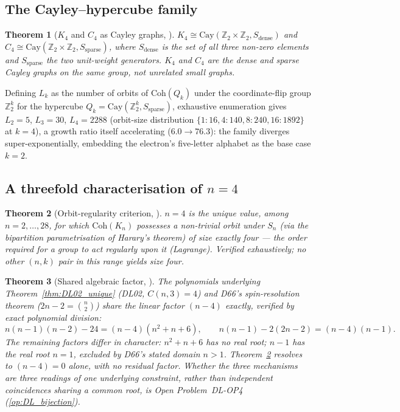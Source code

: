 \documentclass[11pt,a4paper]{article}
\theoremstyle{plain}
\newtheorem{theorem}{Theorem}[section]
\theoremstyle{definition}
\theoremstyle{remark}
\begin{document}
\subsection{The Cayley--hypercube family}

\begin{theorem}[\texorpdfstring{$K_4$}{K4} and \texorpdfstring{$C_4$}{C4} as Cayley graphs, \cite{DL03}]
\label{thm:DL03_cayley}
$K_4\cong\mathrm{Cay}(\mathbb{Z}_2\times\mathbb{Z}_2,S_{\mathrm{dense}})$ and $C_4\cong\mathrm{Cay}(\mathbb{Z}_2\times\mathbb{Z}_2,S_{\mathrm{sparse}})$, where $S_{\mathrm{dense}}$ is the set of all three non-zero elements and $S_{\mathrm{sparse}}$ the two unit-weight generators. $K_4$ and $C_4$ are the dense and sparse Cayley graphs on the same group, not unrelated small graphs.
\end{theorem}

Defining $L_k$ as the number of orbits of $\mathrm{Coh}(Q_k)$ under the coordinate-flip group $\mathbb{Z}_2^k$ for the hypercube $Q_k=\mathrm{Cay}(\mathbb{Z}_2^k,S_{\mathrm{sparse}})$, exhaustive enumeration gives $L_2=5$, $L_3=30$, $L_4=2288$ (orbit-size distribution $\{1{:}16,4{:}140,8{:}240,16{:}1892\}$ at $k=4$), a growth ratio itself accelerating ($6.0\to76.3$): the family diverges super-exponentially, embedding the electron's five-letter alphabet as the base case $k=2$.

\subsection{A threefold characterisation of \texorpdfstring{$n=4$}{n=4}}

\begin{theorem}[Orbit-regularity criterion, \cite{DL03}]
\label{thm:DL03_orbit}
$n=4$ is the unique value, among $n=2,\ldots,28$, for which $\mathrm{Coh}(K_n)$ possesses a non-trivial orbit under $S_n$ (via the bipartition parametrisation of Harary's theorem) of size exactly four --- the order required for a group to act regularly upon it (Lagrange). Verified exhaustively; no other $(n,k)$ pair in this range yields size four.
\end{theorem}

\begin{theorem}[Shared algebraic factor, \cite{DL03}]
\label{thm:DL03_factorisation}
The polynomials underlying Theorem~\ref{thm:DL02_unique} (DL02, $C(n,3)=4$) and D66's spin-resolution theorem ($2n-2=\binom n2$) share the linear factor $(n-4)$ exactly, verified by exact polynomial division:
\begin{equation}
n(n-1)(n-2)-24 = (n-4)(n^2+n+6), \qquad n(n-1)-2(2n-2) = (n-4)(n-1).
\end{equation}
The remaining factors differ in character: $n^2+n+6$ has no real root; $n-1$ has the real root $n=1$, excluded by D66's stated domain $n>1$. Theorem~\ref{thm:DL03_orbit} resolves to $(n-4)=0$ alone, with no residual factor. Whether the three mechanisms are three readings of one underlying constraint, rather than independent coincidences sharing a common root, is Open Problem~DL-OP4 (\ref{op:DL_bijection}).
\end{theorem}
\end{document}
